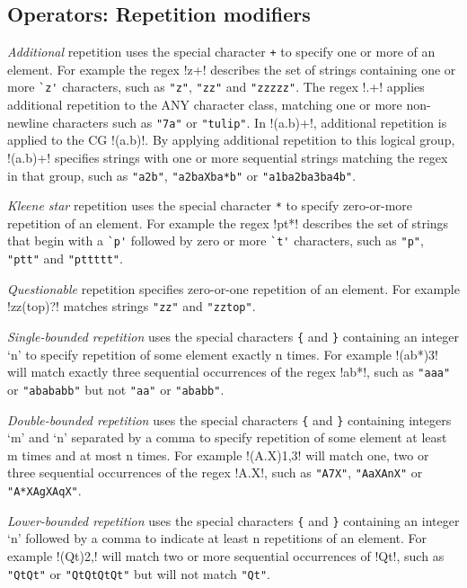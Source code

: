 \subsection*{Operators: Repetition modifiers}
\begin{description} \itemsep -1pt
\item[ADD:] \emph{Additional} repetition uses the special character \verb!+! to specify one or more of an element.  For example the regex \cverb!z+! describes the set of strings containing one or more \verb!`z'! characters, such as \verb!"z"!, \verb!"zz"! and \verb!"zzzzz"!.  The regex \cverb!.+! applies additional repetition to the ANY character class, matching one or more non-newline characters such as \verb!"7a"! or \verb!"tulip"!.  In \cverb!(a.b)+!, additional repetition is applied to the CG \cverb!(a.b)!.   By applying additional repetition to this logical group, \cverb!(a.b)+! specifies strings with one or more sequential strings matching the regex in that group, such as \verb!"a2b"!, \verb!"a2baXba*b"! or \verb!"a1ba2ba3ba4b"!.
\item[KLE:] \emph{Kleene star} repetition uses the special character \verb!*! to specify zero-or-more repetition of an element.  For example the regex \cverb!pt*! describes the set of strings that begin with a \verb!`p'! followed by zero or more \verb!`t'! characters, such as \verb!"p"!, \verb!"ptt"! and \verb!"pttttt"!.
\item[QST:] \emph{Questionable} repetition specifies zero-or-one repetition of an element.  For example \cverb!zz(top)?! matches strings \verb!"zz"! and \verb!"zztop"!.
\item[SNG:] \emph{Single-bounded repetition} uses the special characters \verb!{! and \verb!}! containing an integer `n' to specify repetition of some element exactly n times.  For example \cverb!(ab*){3}! will match exactly three sequential occurrences of the regex \cverb!ab*!, such as \verb!"aaa"! or \verb!"abababb"! but not \verb!"aa"! or \verb!"ababb"!.
\item[DBB:] \emph{Double-bounded repetition} uses the special characters \verb!{! and \verb!}! containing integers `m' and `n' separated by a comma to specify repetition of some element at least m times and at most n times.  For example \cverb!(A.X){1,3}! will match one, two or three sequential occurrences of the regex \cverb!A.X!, such as \verb!"A7X"!, \verb!"AaXAnX"! or \verb!"A*XAgXAqX"!.
\item[LWB:] \emph{Lower-bounded repetition} uses the special characters \verb!{! and \verb!}! containing an integer `n' followed by a comma to indicate at least n repetitions of an element.  For example \cverb!(Qt){2,}! will match two or more sequential occurrences of \cverb!Qt!, such as \verb!"QtQt"! or \verb!"QtQtQtQt"! but will not match \verb!"Qt"!.

\end{description}
